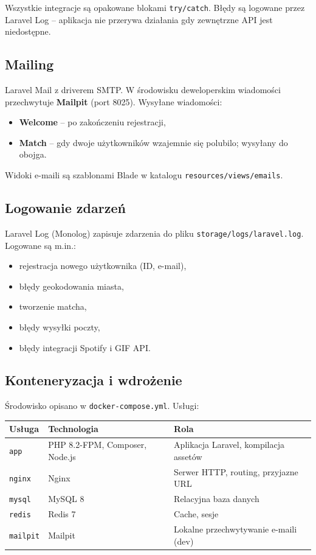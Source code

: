 \documentclass[12pt,a4paper]{article}
\begin{document}
Wszystkie integracje są opakowane blokami \texttt{try/catch}. Błędy są logowane przez Laravel Log -- aplikacja nie przerywa działania gdy zewnętrzne API jest niedostępne.

\subsection{Mailing}

Laravel Mail z driverem SMTP. W środowisku deweloperskim wiadomości przechwytuje \textbf{Mailpit} (port 8025). Wysyłane wiadomości:
\begin{itemize}
    \item \textbf{Welcome} -- po zakończeniu rejestracji,
    \item \textbf{Match} -- gdy dwoje użytkowników wzajemnie się polubilo; wysyłany do obojga.
\end{itemize}

Widoki e-maili są szablonami Blade w katalogu \texttt{resources/views/emails}.

\subsection{Logowanie zdarzeń}

Laravel Log (Monolog) zapisuje zdarzenia do pliku \texttt{storage/logs/laravel.log}. Logowane są m.in.:
\begin{itemize}
    \item rejestracja nowego użytkownika (ID, e-mail),
    \item błędy geokodowania miasta,
    \item tworzenie matcha,
    \item błędy wysyłki poczty,
    \item błędy integracji Spotify i GIF API.
\end{itemize}

\subsection{Konteneryzacja i wdrożenie}

Środowisko opisano w \texttt{docker-compose.yml}. Usługi:

\begin{longtable}{|p{2.5cm}|p{4.0cm}|p{6.7cm}|}
\hline
\textbf{Usługa} & \textbf{Technologia} & \textbf{Rola} \\
\hline
\texttt{app} & PHP 8.2-FPM, Composer, Node.js & Aplikacja Laravel, kompilacja assetów \\
\hline
\texttt{nginx} & Nginx & Serwer HTTP, routing, przyjazne URL \\
\hline
\texttt{mysql} & MySQL 8 & Relacyjna baza danych \\
\hline
\texttt{redis} & Redis 7 & Cache, sesje \\
\hline
\texttt{mailpit} & Mailpit & Lokalne przechwytywanie e-maili (dev) \\
\hline
\end{longtable}
\end{document}
